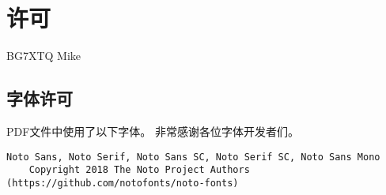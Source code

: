 \chapter*{许可}

\noindent {} BG7XTQ Mike

\section*{字体许可}

\noindent PDF文件中使用了以下字体。
非常感谢各位字体开发者们。

\begin{lstlisting}[numbers=none]
Noto Sans, Noto Serif, Noto Sans SC, Noto Serif SC, Noto Sans Mono
    Copyright 2018 The Noto Project Authors (https://github.com/notofonts/noto-fonts)
\end{lstlisting}
